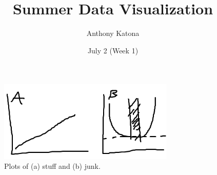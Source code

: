 \documentclass{article}
\title{Summer Data Visualization}
\author{Anthony Katona}
\date{July 2 (Week 1)}
\begin{document}
\maketitle

\begin{figure}[!htb]
    \centering
    \includegraphics[width = 3.3in]{stuffvsjunk.png}
    \caption{Plots of (a) stuff and (b) junk.}
    \label{revision-soxhlet}
\end{figure}
\end{document}
